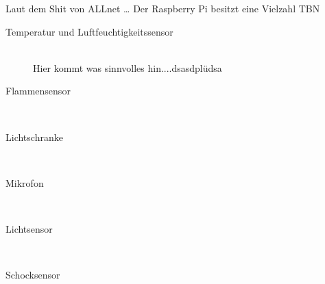 
Laut dem Shit von ALLnet \cite{111861pd90} \ldots
Der Raspberry Pi besitzt eine Vielzahl  TBN

\begin{description}
\item[Temperatur und Luftfeuchtigkeitssensor] \hfill \\
	Hier kommt was sinnvolles hin....dsasdplüdsa
\item[Flammensensor]\hfill \\
\item[Lichtschranke]\hfill \\
\item[Mikrofon]\hfill \\
\item[Lichtsensor]\hfill \\
\item[Schocksensor]\hfill \\
\end{description}